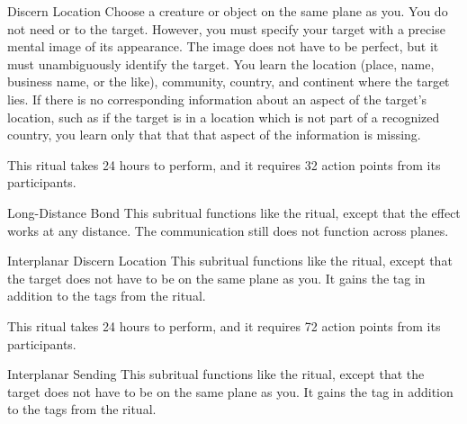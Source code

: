 \begin{ability}[\nth{4}]{Discern Location}
Choose a creature or object on the same plane as you.
You do not need  or  to the target.
However, you must specify your target with a precise mental image of its appearance.
The image does not have to be perfect, but it must unambiguously identify the target.
You learn the location (place, name, business name, or the like), community, country, and continent where the target lies.
If there is no corresponding information about an aspect of the target's location, such as if the target is in a location which is not part of a recognized country,
you learn only that that that aspect of the information is missing.

This ritual takes 24 hours to perform, and it requires 32 action points from its participants.
\end{ability}
\vspace{0.25em}



\begin{ability}[\nth{5}]{Long-Distance Bond}
This subritual functions like the  ritual, except that the effect works at any distance.
The communication still does not function across planes.
\end{ability}
\vspace{0.25em}



\begin{ability}[\nth{6}]{Interplanar Discern Location}
This subritual functions like the  ritual, except that the target does not have to be on the same plane as you.
It gains the  tag in addition to the tags from the  ritual.

This ritual takes 24 hours to perform, and it requires 72 action points from its participants.
\end{ability}
\vspace{0.25em}



\begin{ability}[\nth{6}]{Interplanar Sending}
This subritual functions like the  ritual, except that the target does not have to be on the same plane as you.
It gains the  tag in addition to the tags from the  ritual.
\end{ability}
\vspace{0.25em}




